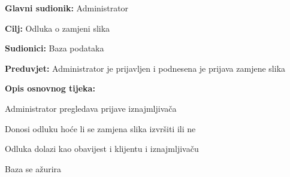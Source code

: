 						\noindent {}
					\begin{packed_item}
	
						\item \textbf{Glavni sudionik: }Administrator
						\item  \textbf{Cilj: }Odluka o zamjeni slika
						\item  \textbf{Sudionici: }Baza podataka
						\item  \textbf{Preduvjet: }Administrator je prijavljen i podnesena je prijava zamjene slika
						\item  \textbf{Opis osnovnog tijeka:}
						
						\item[] \begin{packed_enum}
	
							\item Administrator pregledava prijave iznajmljivača
							\item Donosi odluku hoće li se zamjena slika izvršiti ili ne
							\item Odluka dolazi kao obavijest i klijentu i iznajmljivaču
							\item Baza se ažurira


						\end{packed_enum}
									
					\end{packed_item}	





